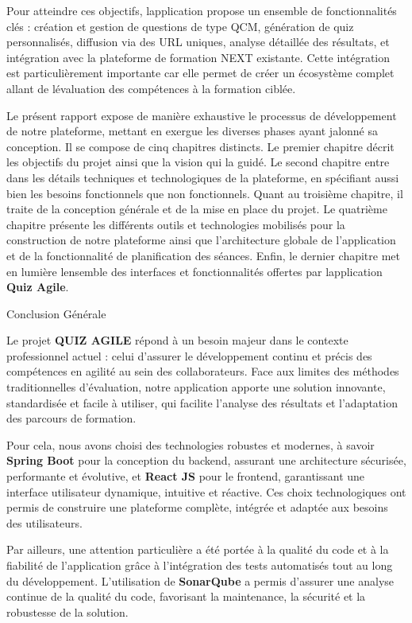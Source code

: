 \documentclass[12pt,a4paper,twoside]{report}
\begin{document}
Pour atteindre ces objectifs, l\textquotesingle application propose un
ensemble de fonctionnalités clés : création et gestion de questions de
type QCM, génération de quiz personnalisés, diffusion via des URL
uniques, analyse détaillée des résultats, et intégration avec la
plateforme de formation NEXT existante. Cette intégration est
particulièrement importante car elle permet de créer un écosystème
complet allant de l\textquotesingle évaluation des compétences à la
formation ciblée.

Le présent rapport expose de manière exhaustive le processus de
développement de notre plateforme, mettant en exergue les diverses
phases ayant jalonné sa conception. Il se compose de cinq chapitres
distincts. Le premier chapitre décrit les objectifs du projet ainsi que
la vision qui l\textquotesingle a guidé. Le second chapitre entre dans
les détails techniques et technologiques de la plateforme, en spécifiant
aussi bien les besoins fonctionnels que non fonctionnels. Quant au
troisième chapitre, il traite de la conception générale et de la mise en
place du projet. Le quatrième chapitre présente les différents outils et
technologies mobilisés pour la construction de notre plateforme ainsi
que l'architecture globale de l'application et de la fonctionnalité de
planification des séances. Enfin, le dernier chapitre met en lumière
l\textquotesingle ensemble des interfaces et fonctionnalités offertes
par l\textquotesingle application \textbf{Quiz Agile}.

\hfill\break
Conclusion Générale

Le projet \textbf{QUIZ AGILE} répond à un besoin majeur dans le contexte
professionnel actuel : celui d'assurer le développement continu et
précis des compétences en agilité au sein des collaborateurs. Face aux
limites des méthodes traditionnelles d'évaluation, notre application
apporte une solution innovante, standardisée et facile à utiliser, qui
facilite l'analyse des résultats et l'adaptation des parcours de
formation.

Pour cela, nous avons choisi des technologies robustes et modernes, à
savoir \textbf{Spring Boot} pour la conception du backend, assurant une
architecture sécurisée, performante et évolutive, et \textbf{React JS}
pour le frontend, garantissant une interface utilisateur dynamique,
intuitive et réactive. Ces choix technologiques ont permis de construire
une plateforme complète, intégrée et adaptée aux besoins des
utilisateurs.

Par ailleurs, une attention particulière a été portée à la qualité du
code et à la fiabilité de l'application grâce à l'intégration des tests
automatisés tout au long du développement. L'utilisation de
\textbf{SonarQube} a permis d'assurer une analyse continue de la qualité
du code, favorisant la maintenance, la sécurité et la robustesse de la
solution.
\end{document}
